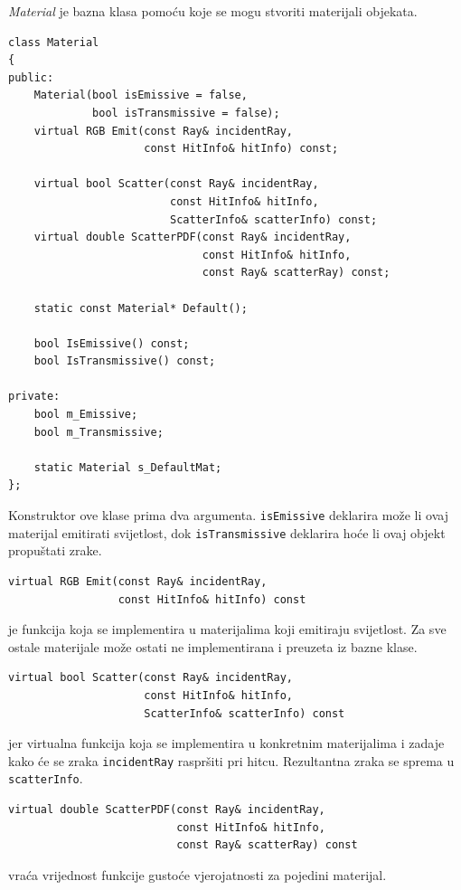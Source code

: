 \documentclass[
12pt, %
oneside, %
english, %
singlespacing, %
parskip, %
headsepline, %
chapterinoneline, %
consistentlayout, %
]{MastersDoctoralThesis} %
\begin{document}
\begin{minipage}{\textwidth}

	\emph{Material} je bazna klasa pomoću koje se mogu stvoriti materijali objekata.

\begin{verbatim}
class Material
{
public:
	Material(bool isEmissive = false, 
             bool isTransmissive = false);
	virtual RGB Emit(const Ray& incidentRay,
                     const HitInfo& hitInfo) const;

	virtual bool Scatter(const Ray& incidentRay, 
	                     const HitInfo& hitInfo,
                         ScatterInfo& scatterInfo) const;
	virtual double ScatterPDF(const Ray& incidentRay, 
                              const HitInfo& hitInfo,
                              const Ray& scatterRay) const;

	static const Material* Default();

	bool IsEmissive() const;
	bool IsTransmissive() const;

private:
	bool m_Emissive;
	bool m_Transmissive;

	static Material s_DefaultMat;
};
\end{verbatim}
\end{minipage}

Konstruktor ove klase prima dva argumenta. \texttt{isEmissive} deklarira može li ovaj materijal
emitirati svijetlost, dok \texttt{isTransmissive} deklarira hoće li ovaj objekt propuštati
zrake.
\\

\begin{verbatim}
virtual RGB Emit(const Ray& incidentRay, 
                 const HitInfo& hitInfo) const
\end{verbatim}
je funkcija koja se implementira u materijalima koji emitiraju svijetlost. Za sve ostale
materijale može ostati ne implementirana i preuzeta iz bazne klase.

\begin{verbatim}
virtual bool Scatter(const Ray& incidentRay, 
                     const HitInfo& hitInfo, 
                     ScatterInfo& scatterInfo) const
\end{verbatim}
jer virtualna funkcija koja se implementira u konkretnim materijalima i zadaje kako će se
zraka \texttt{incidentRay} raspršiti pri hitcu. Rezultantna zraka se sprema u 
\texttt{scatterInfo}.


\begin{verbatim}
virtual double ScatterPDF(const Ray& incidentRay,
                          const HitInfo& hitInfo, 
                          const Ray& scatterRay) const
\end{verbatim}
vraća vrijednost funkcije gustoće vjerojatnosti za pojedini materijal.
\end{document}
